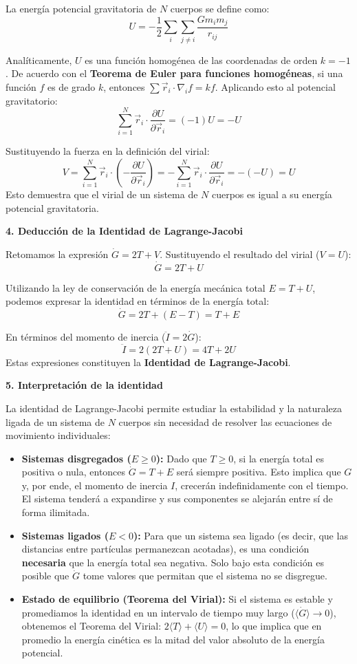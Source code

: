 \documentclass[12pt, letterpaper]{article}
\begin{document}
La energía potencial gravitatoria de $N$ cuerpos se define como:
$$ U = -\frac{1}{2} \sum_{i} \sum_{j \neq i} \frac{G m_i m_j}{r_{ij}} $$

Analíticamente, $U$ es una función homogénea de las coordenadas de orden $k = -1$. De acuerdo con el \textbf{Teorema de Euler para funciones homogéneas}, si una función $f$ es de grado $k$, entonces $\sum \vec{r}_i \cdot \nabla_i f = kf$. Aplicando esto al potencial gravitatorio:
$$ \sum_{i=1}^N \vec{r}_i \cdot \frac{\partial U}{\partial \vec{r}_i} = (-1) U = -U $$

Sustituyendo la fuerza en la definición del virial:
$$ V = \sum_{i=1}^N \vec{r}_i \cdot \left( -\frac{\partial U}{\partial \vec{r}_i} \right) = - \sum_{i=1}^N \vec{r}_i \cdot \frac{\partial U}{\partial \vec{r}_i} = -(-U) = U $$
Esto demuestra que el virial de un sistema de $N$ cuerpos es igual a su energía potencial gravitatoria.

\textbf{4. Deducción de la Identidad de Lagrange-Jacobi}

Retomamos la expresión $\dot{G} = 2T + V$. Sustituyendo el resultado del virial ($V=U$):
$$ \dot{G} = 2T + U $$

Utilizando la ley de conservación de la energía mecánica total $E = T + U$, podemos expresar la identidad en términos de la energía total:
$$ \dot{G} = 2T + (E - T) = T + E $$

En términos del momento de inercia ($\ddot{I} = 2\dot{G}$):
$$ \ddot{I} = 2(2T + U) = 4T + 2U $$
Estas expresiones constituyen la \textbf{Identidad de Lagrange-Jacobi}.

\textbf{5. Interpretación de la identidad}

La identidad de Lagrange-Jacobi permite estudiar la estabilidad y la naturaleza ligada de un sistema de $N$ cuerpos sin necesidad de resolver las ecuaciones de movimiento individuales:

\begin{itemize}
    \item \textbf{Sistemas disgregados ($E \geq 0$):} Dado que $T \geq 0$, si la energía total es positiva o nula, entonces $\dot{G} = T + E$ será siempre positiva. Esto implica que $G$ y, por ende, el momento de inercia $I$, crecerán indefinidamente con el tiempo. El sistema tenderá a expandirse y sus componentes se alejarán entre sí de forma ilimitada.
    \item \textbf{Sistemas ligados ($E < 0$):} Para que un sistema sea ligado (es decir, que las distancias entre partículas permanezcan acotadas), es una condición \textbf{necesaria} que la energía total sea negativa. Solo bajo esta condición es posible que $\dot{G}$ tome valores que permitan que el sistema no se disgregue.
    \item \textbf{Estado de equilibrio (Teorema del Virial):} Si el sistema es estable y promediamos la identidad en un intervalo de tiempo muy largo ($\langle \dot{G} \rangle \to 0$), obtenemos el Teorema del Virial: $2\langle T \rangle + \langle U \rangle = 0$, lo que implica que en promedio la energía cinética es la mitad del valor absoluto de la energía potencial.
\end{itemize}
\end{document}

